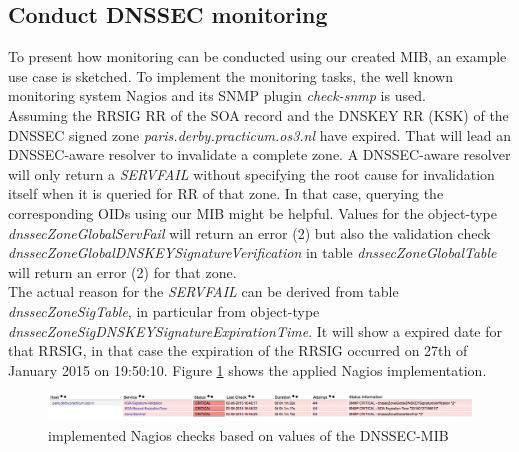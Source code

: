 \subsection{Conduct DNSSEC monitoring}
\label{section:conduct-dnssec-monitoring}
To present how monitoring can be conducted using our created MIB, an example use case is sketched. To implement the monitoring tasks, the well known monitoring system Nagios \cite{nagios} and its SNMP plugin \textit{check-snmp} \cite{check-snmp} is used.
\\
Assuming the RRSIG RR of the SOA record and the DNSKEY RR (KSK) of the DNSSEC signed zone \textit{paris.derby.practicum.os3.nl} have expired. That will lead an DNSSEC-aware resolver to invalidate a complete zone. A DNSSEC-aware resolver will only return a \textit{SERVFAIL} without specifying the root cause for invalidation itself when it is queried for RR of that zone. In that case, querying the corresponding OIDs using our MIB might be helpful. Values for the object-type \textit{ dnssecZoneGlobalServFail} will return an error (2) but also the validation check \textit{dnssecZoneGlobalDNSKEYSignatureVerification} in table \textit{dnssecZoneGlobalTable} will return an error (2) for that zone. 
\\
The actual reason for the \textit{SERVFAIL} can be derived from table \textit{ dnssecZoneSigTable}, in particular from object-type \textit{ dnssecZoneSigDNSKEYSignatureExpirationTime}. It will show a expired date for that RRSIG, in that case the expiration of the RRSIG occurred on 27th of January 2015 on 19:50:10. Figure \ref{figure:nagios} shows the applied Nagios implementation.

\begin{figure}[H]
\centering
\includegraphics[scale=0.3]{Images/nagios.pdf}
\caption{implemented Nagios checks based on values of the DNSSEC-MIB}
\label{figure:nagios}
\end{figure}
 
